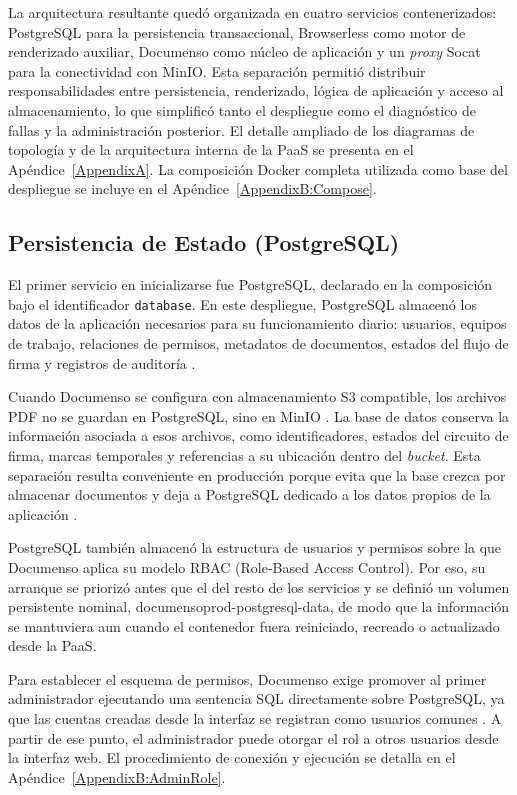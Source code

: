 La arquitectura resultante quedó organizada en cuatro servicios contenerizados: PostgreSQL para la persistencia transaccional, Browserless como motor de renderizado auxiliar, Documenso como núcleo de aplicación y un \textit{proxy} Socat para la conectividad con MinIO. Esta separación permitió distribuir responsabilidades entre persistencia, renderizado, lógica de aplicación y acceso al almacenamiento, lo que simplificó tanto el despliegue como el diagnóstico de fallas y la administración posterior. El detalle ampliado de los diagramas de topología y de la arquitectura interna de la PaaS se presenta en el Apéndice~\ref{AppendixA}. La composición Docker completa utilizada como base del despliegue se incluye en el Apéndice~\ref{AppendixB:Compose}.

\subsection{Persistencia de Estado (PostgreSQL)}
\label{subsec:postgresql}

El primer servicio en inicializarse fue PostgreSQL, declarado en la composición bajo el identificador \texttt{database}. En este despliegue, PostgreSQL almacenó los datos de la aplicación necesarios para su funcionamiento diario: usuarios, equipos de trabajo, relaciones de permisos, metadatos de documentos, estados del flujo de firma y registros de auditoría \cite{documenso_backups}.

Cuando Documenso se configura con almacenamiento S3 compatible, los archivos PDF no se guardan en PostgreSQL, sino en MinIO \cite{documenso_storage_config,documenso_backups}. La base de datos conserva la información asociada a esos archivos, como identificadores, estados del circuito de firma, marcas temporales y referencias a su ubicación dentro del \textit{bucket}. Esta separación resulta conveniente en producción porque evita que la base crezca por almacenar documentos y deja a PostgreSQL dedicado a los datos propios de la aplicación \cite{documenso_storage_config}.

PostgreSQL también almacenó la estructura de usuarios y permisos sobre la que Documenso aplica su modelo RBAC (Role-Based Access Control). Por eso, su arranque se priorizó antes que el del resto de los servicios y se definió un volumen persistente nominal, documensoprod-postgresql-data, de modo que la información se mantuviera aun cuando el contenedor fuera reiniciado, recreado o actualizado desde la PaaS.

Para establecer el esquema de permisos, Documenso exige promover al primer administrador ejecutando una sentencia SQL directamente sobre PostgreSQL, ya que las cuentas creadas desde la interfaz se registran como usuarios comunes \cite{documenso_quick_start}. A partir de ese punto, el administrador puede otorgar el rol a otros usuarios desde la interfaz web. El procedimiento de conexión y ejecución se detalla en el Apéndice~\ref{AppendixB:AdminRole}.

